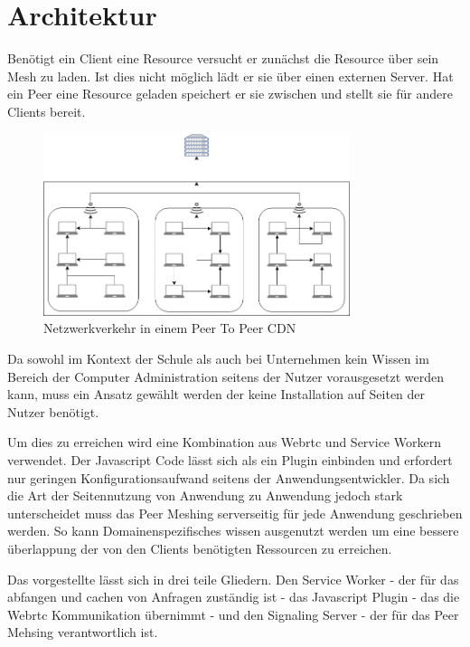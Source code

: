 \section{Architektur}

Benötigt ein Client eine Resource versucht er zunächst die Resource über sein \pTp Mesh zu laden. Ist dies nicht möglich lädt er sie über einen externen Server. Hat ein Peer eine Resource geladen speichert er sie zwischen und stellt sie für andere Clients bereit.

\begin{figure}[!h]
	\centering
	\includegraphics[width=0.8\textwidth]{figures/network_p2p}
	\caption[A Figure Short-Title]{Netzwerkverkehr in einem Peer To Peer CDN}
	\label{fig:mesh}
\end{figure}

Da sowohl im Kontext der Schule als auch bei Unternehmen kein Wissen im Bereich der Computer Administration seitens der Nutzer vorausgesetzt werden kann, muss ein Ansatz gewählt werden der keine Installation auf Seiten der Nutzer benötigt.

Um dies zu erreichen wird eine Kombination aus Webrtc und Service Workern verwendet. Der Javascript Code lässt sich als ein Plugin einbinden und erfordert nur geringen Konfigurationsaufwand seitens der Anwendungsentwickler. Da sich die Art der Seitennutzung von Anwendung zu Anwendung jedoch stark unterscheidet muss das Peer Meshing serverseitig für jede Anwendung geschrieben werden. So kann Domainenspezifisches wissen ausgenutzt werden um eine bessere überlappung der von den Clients benötigten Ressourcen zu erreichen. 

Das vorgestellte \pTp \cdn lässt sich in drei teile Gliedern. Den Service Worker - der für das abfangen und cachen von Anfragen zuständig ist - das Javascript Plugin - das die Webrtc Kommunikation übernimmt - und den Signaling Server - der für das Peer Mehsing verantwortlich ist. 

